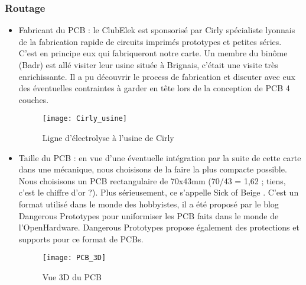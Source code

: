 \subsubsection{Routage}       
\begin{itemize}
	\item Fabricant du \gls{PCB} : le ClubElek est sponsorisé par Cirly \autocite{Cirly} spécialiste lyonnais de la fabrication rapide de circuits imprimés prototypes et petites séries.
	      C'est en principe eux qui fabriqueront notre carte.
	      Un membre du binôme (Badr) est allé visiter leur usine située à Brignais, c'était une visite très enrichissante.
	      Il a pu découvrir le process de fabrication et discuter avec eux des éventuelles contraintes à garder en tête lors de la conception de \gls{PCB} 4 couches.
	          
	      \begin{figure}[H]
	      	\begin{center}
	      		\texttt{[image: Cirly\_usine]}
	      	\end{center}
	      	\caption{Ligne d'électrolyse à l'usine de Cirly}
	      \end{figure}
	                
	\item Taille du \gls{PCB} : en vue d'une éventuelle intégration par la suite de cette carte dans une mécanique, nous choisisons de la faire la plus compacte possible. \\
	      Nous choisisons un \gls{PCB} rectangulaire de 70x43mm (70/43 = 1,62 ; tiens, c'est le chiffre d'or ?).
	      Plus sérieusement, ce  s'appelle Sick of Beige \autocite{DPSOB}. C'est un format utilisé dans le monde des hobbyistes, il a été proposé par le blog Dangerous Prototypes pour uniformiser les \gls{PCB} faits dans le monde de l'OpenHardware. Dangerous Prototypes propose également des protections et supports pour ce format de \glspl{PCB}.
	          
	      \begin{figure}[H]
	      	\begin{center}
	      		\texttt{[image: PCB\_3D]}
	      	\end{center}
	      	\caption{Vue 3D du PCB}
	      \end{figure}
	          

\end{itemize}
